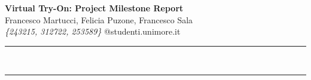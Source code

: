 \documentclass[a4paper,12pt]{article}
\renewenvironment{abstract}
 {\par\noindent\textbf{\abstractname}\ \ignorespaces \\}
 {\par\noindent\medskip}
\begin{document}
\pagestyle{fancy}
\thispagestyle{empty}
\fancyhead[L]{}

\renewcommand*{\thefootnote}{\fnsymbol{footnote}}

\begin{center}
\Large{\textbf{Virtual Try-On: Project Milestone Report}} 
\vspace{0.4cm}
\normalsize
\\ Francesco Martucci, Felicia Puzone, Francesco Sala \\
\vspace{0.1cm}
\textit{\{243215, 312722, 253589\}}
\small{@studenti.unimore.it}
\medskip
\normalsize
\end{center}

{\color{gray}\hrule}
\vspace{0.4cm}
\begin{abstract}

\end{abstract}

{\color{gray}\hrule}
\medskip






\end{document}
